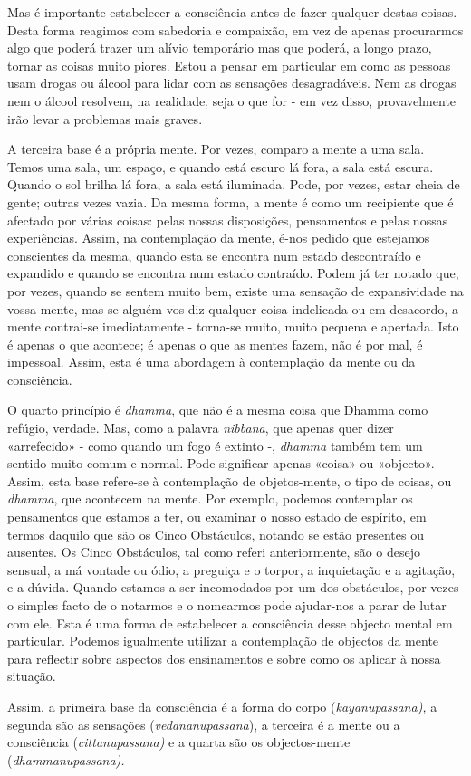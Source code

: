 Mas é importante estabelecer a consciência antes de fazer qualquer
destas coisas. Desta forma reagimos com sabedoria e compaixão, em vez de
apenas procurarmos algo que poderá trazer um alívio temporário mas que
poderá, a longo prazo, tornar as coisas muito piores. Estou a pensar em
particular em como as pessoas usam drogas ou álcool para lidar com as
sensações desagradáveis. Nem as drogas nem o álcool resolvem, na
realidade, seja o que for - em vez disso, provavelmente irão levar a
problemas mais graves.

A terceira base é a própria mente. Por vezes, comparo a mente a uma
sala. Temos uma sala, um espaço, e quando está escuro lá fora, a sala
está escura. Quando o sol brilha lá fora, a sala está iluminada. Pode,
por vezes, estar cheia de gente; outras vezes vazia. Da mesma forma, a
mente é como um recipiente que é afectado por várias coisas: pelas
nossas disposições, pensamentos e pelas nossas experiências. Assim, na
contemplação da mente, é-nos pedido que estejamos conscientes da mesma,
quando esta se encontra num estado descontraído e expandido e quando se
encontra num estado contraído. Podem já ter notado que, por vezes,
quando se sentem muito bem, existe uma sensação de expansividade na
vossa mente, mas se alguém vos diz qualquer coisa indelicada ou em
desacordo, a mente contrai-se imediatamente - torna-se muito, muito
pequena e apertada. Isto é apenas o que acontece; é apenas o que as
mentes fazem, não é por mal, é impessoal. Assim, esta é uma abordagem à
contemplação da mente ou da consciência.

O quarto princípio é \emph{dhamma}, que não é a mesma coisa que Dhamma
como refúgio, verdade. Mas, como a palavra \emph{nibbana}, que apenas
quer dizer «arrefecido» - como quando um fogo é extinto -, \emph{dhamma}
também tem um sentido muito comum e normal. Pode significar apenas
«coisa» ou «objecto». Assim, esta base refere-se à contemplação de
objetos-mente, o tipo de coisas, ou \emph{dhamma}, que acontecem na
mente. Por exemplo, podemos contemplar os pensamentos que estamos a ter,
ou examinar o nosso estado de espírito, em termos daquilo que são os
Cinco Obstáculos, notando se estão presentes ou ausentes. Os Cinco
Obstáculos, tal como referi anteriormente, são o desejo sensual, a má
vontade ou ódio, a preguiça e o torpor, a inquietação e a agitação, e a
dúvida. Quando estamos a ser incomodados por um dos obstáculos, por
vezes o simples facto de o notarmos e o nomearmos pode ajudar-nos a
parar de lutar com ele. Esta é uma forma de estabelecer a consciência
desse objecto mental em particular. Podemos igualmente utilizar a
contemplação de objectos da mente para reflectir sobre aspectos dos
ensinamentos e sobre como os aplicar à nossa situação.

Assim, a primeira base da consciência é a forma do corpo
(\emph{kayanupassana),} a segunda são as sensações
(\emph{vedananupassana}), a terceira é a mente ou a consciência
(\emph{cittanupassana)} e a quarta são os objectos-mente
(\emph{dhammanupassana).}

